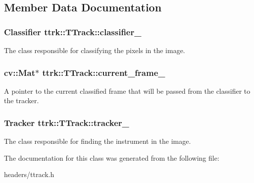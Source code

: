 \subsection{Member Data Documentation}
\hypertarget{classttrk_1_1TTrack_a0ee6c4dee1ee39cd387f847be0336381}{
\subsubsection[{classifier\_\-}]{\setlength{\rightskip}{0pt plus 5cm}Classifier {\bf ttrk::TTrack::classifier\_\-}}}
\label{classttrk_1_1TTrack_a0ee6c4dee1ee39cd387f847be0336381}
The class responsible for classifying the pixels in the image. \hypertarget{classttrk_1_1TTrack_a1b376079d9dbf9ef143d64fff627fcc1}{
\subsubsection[{current\_\-frame\_\-}]{\setlength{\rightskip}{0pt plus 5cm}cv::Mat$\ast$ {\bf ttrk::TTrack::current\_\-frame\_\-}}}
\label{classttrk_1_1TTrack_a1b376079d9dbf9ef143d64fff627fcc1}
A pointer to the current classified frame that will be passed from the classifier to the tracker. \hypertarget{classttrk_1_1TTrack_a6d7c76c7b81abdd52965acd500feec53}{
\subsubsection[{tracker\_\-}]{\setlength{\rightskip}{0pt plus 5cm}Tracker {\bf ttrk::TTrack::tracker\_\-}}}
\label{classttrk_1_1TTrack_a6d7c76c7b81abdd52965acd500feec53}
The class responsible for finding the instrument in the image. 

The documentation for this class was generated from the following file:\begin{DoxyCompactItemize}
\item 
headers/ttrack.h\end{DoxyCompactItemize}
